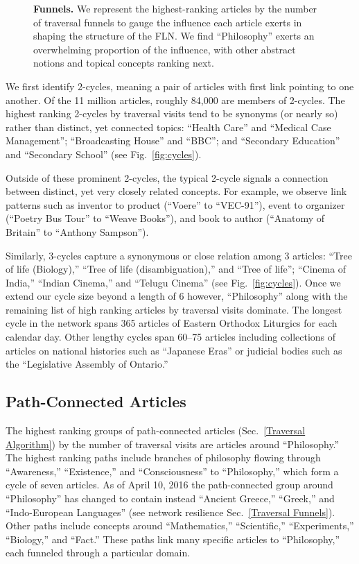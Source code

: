 \documentclass[pre,twocolumn,twoside,superscriptaddress,floatfix]{revtex4-1}
\begin{document}
{\begin{figure}[tp!]
  \caption{
    \textbf{Funnels.}
We represent the highest-ranking articles by the number of traversal 
funnels to gauge the influence each article exerts in shaping the 
structure of the FLN. 
We find ``Philosophy'' exerts an overwhelming proportion
of the influence, with other abstract notions and topical concepts ranking
next.}
  \label{fig:Funnels}
\end{figure}

We first identify 2-cycles, meaning a pair of articles with first link pointing to one another.
Of the 11 million articles, roughly 84,000 are members of 2-cycles. 
The highest ranking 2-cycles by traversal visits tend to be synonyms (or nearly so) rather than distinct, yet connected topics:
``Health Care'' and ``Medical Case Management''; ``Broadcasting House'' and ``BBC''; and ``Secondary Education'' and ``Secondary School'' 
(see Fig.~\ref{fig:cycles}).

Outside of these prominent 2-cycles, the typical 2-cycle signals a connection between distinct, yet very closely related concepts. 
For example, we observe link patterns such as inventor to product (``Voere'' to ``VEC-91''), event to organizer (``Poetry Bus Tour'' to ``Weave Books''), and book to author (``Anatomy of Britain'' to ``Anthony Sampson'').

Similarly, 3-cycles capture a synonymous or close relation among 3 articles: ``Tree of life (Biology),'' ``Tree of life (disambiguation),'' 
and ``Tree of life''; ``Cinema of India,'' ``Indian Cinema,'' and ``Telugu Cinema''
(see Fig.~\ref{fig:cycles}).
Once we extend our cycle size beyond a length of 6 however, 
``Philosophy'' along with the remaining list of high ranking articles by traversal visits dominate.
The longest cycle in the network spans 365 articles of Eastern Orthodox Liturgics for each calendar day.
Other lengthy cycles span 60--75 articles including collections of articles on national histories such as ``Japanese Eras'' 
or judicial bodies such as the ``Legislative Assembly of Ontario.''

\subsection{Path-Connected Articles}

The highest ranking groups of path-connected articles (Sec.~\ref{Traversal Algorithm}) by the number of traversal visits are articles around ``Philosophy.'' 
The highest ranking paths include branches of philosophy flowing through 
``Awareness,'' ``Existence,'' and ``Consciousness'' to ``Philosophy,'' 
which form a cycle of seven articles. As of April 10, 2016 the path-connected group around
``Philosophy'' has changed to contain instead ``Ancient Greece,'' ``Greek,'' and 
``Indo-European Languages'' (see network resilience Sec.~\ref{Traversal Funnels}).
Other paths
include concepts around ``Mathematics,'' ``Scientific,'' ``Experiments,'' 
``Biology,'' and ``Fact.''
These paths link many specific articles to ``Philosophy,'' each funneled through a particular domain.

}
\end{document}
